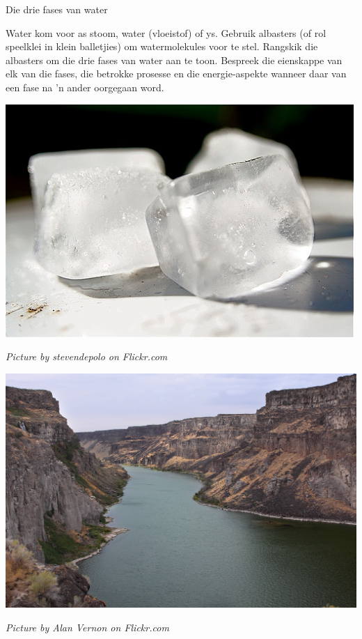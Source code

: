 \begin{activity}{Die drie fases van water}
\begin{minipage}{0.5\textwidth}
Water kom voor as stoom, water (vloeistof) of ys. Gebruik albasters (of rol speelklei in klein balletjies) om watermolekules voor te stel. Rangskik die albasters om die drie fases van water aan te toon. Bespreek die eienskappe van elk van die fases, die betrokke prosesse en die energie-aspekte wanneer daar van een fase na   'n ander oorgegaan word.
\end{minipage}
\begin{minipage}{.5\textwidth}
\begin{center}
 \includegraphics[width=.3\textwidth]{photos/iceby-stevendepolo-flickr.jpg}\par
\textit{Picture by stevendepolo on Flickr.com}
\end{center}
\begin{center}
 \includegraphics[width=.3\textwidth]{photos/AlanVernon.jpg}\par
\textit{Picture by Alan Vernon on Flickr.com}
\end{center}
\end{minipage}
\end{activity}

      
\label{m38730*cid7}

